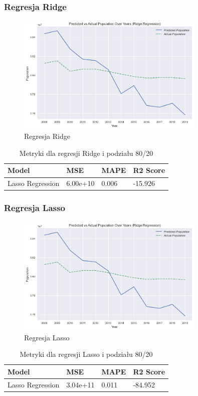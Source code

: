 \documentclass[11pt]{article}
\begin{document}
\subsubsection*{Regresja Ridge}
\begin{figure}[H]
        \centering
        \includegraphics[width=0.8\textwidth]{images/ridge.png}
        \caption{Regresja Ridge}
\end{figure}
\begin{table}[H]
        \centering
        \begin{tabular}{|l|l|l|l|}
        \hline
        Model & MSE & MAPE & R2 Score \\ \hline
        Lasso Regression & 6.00e+10 & 0.006 & -15.926 \\ \hline
        \end{tabular}
        \caption{Metryki dla regresji Ridge i podziału 80/20}
        \end{table}
\subsubsection*{Regresja Lasso}
\begin{figure}[H]
        \centering
        \includegraphics[width=0.8\textwidth]{images/lasso.png}
        \caption{Regresja Lasso}
\end{figure}
\begin{table}[H]
        \centering
        \begin{tabular}{|l|l|l|l|}
        \hline
        Model & MSE & MAPE & R2 Score \\ \hline
        Lasso Regression & 3.04e+11 & 0.011 & -84.952 \\ \hline
        \end{tabular}
        \caption{Metryki dla regresji Lasso i podziału 80/20}
        \end{table}
\end{document}
